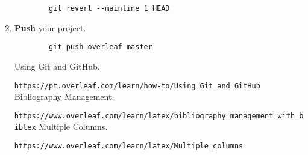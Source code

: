\documentclass[10pt, twocolumn]{article}
\begin{document}
\begin{enumerate}
\begin{verbatim}
        git revert --mainline 1 HEAD
    \end{verbatim}
    \item \textbf{Push} your project.
    \begin{verbatim}
        git push overleaf master
    \end{verbatim}
    \begin{thebibliography}{9}
         Using Git and GitHub. 
        \par \texttt{https://pt.overleaf.com/learn/how-to/Using\_{}Git\_{}and\_{}GitHub}
         Bibliography Management.
        \par \texttt{https://www.overleaf.com/learn/latex/bibliography\_{}management\_{}with\_{}bibtex}
         Multiple Columns.
        \par \texttt{https://www.overleaf.com/learn/latex/Multiple\_{}columns}
    \end{thebibliography}
\end{enumerate}
\end{document}
